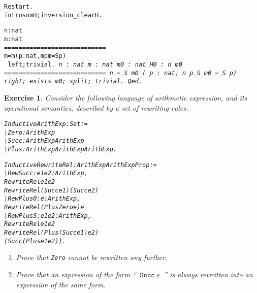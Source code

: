 \documentclass[11pt]{article}
\newtheorem{exercise}{Exercise}[section]
\begin{document}
\begin{alltt}
Restart.
 intros n m H; inversion_clear H.
\it
\it

  n : nat
  m : nat
  ============================
   m = m {\coqor} ({\exsym} p : nat, m {\coqle} p {\coqand} m = S p)
\tt
 left;trivial.
\it
  n : nat
  m : nat
  m0 : nat
  H0 : n {\coqle} m0
  ============================
   n = S m0 {\coqor} ({\exsym} p : nat, n {\coqle} p {\coqand} S m0 = S p)
\tt
 right; exists m0; split; trivial.
Qed.
\end{alltt}





\begin{exercise}
Consider the following language of arithmetic expression, and
its operational semantics, described by a set of rewriting rules.

\begin{alltt}
Inductive ArithExp : Set :=
   | Zero : ArithExp
   | Succ : ArithExp {\arrow} ArithExp
   | Plus : ArithExp {\arrow} ArithExp {\arrow} ArithExp.

Inductive RewriteRel : ArithExp {\arrow} ArithExp {\arrow} Prop :=
  |  RewSucc  : {\prodsym} e1 e2 :ArithExp,
                  RewriteRel e1 e2 {\arrow}
                   RewriteRel (Succ e1) (Succ e2)
  |  RewPlus0 : {\prodsym} e:ArithExp,
                  RewriteRel (Plus Zero e) e
  |  RewPlusS : {\prodsym} e1 e2:ArithExp,
                  RewriteRel e1 e2 {\arrow}
                  RewriteRel (Plus (Succ e1) e2)
                             (Succ (Plus e1 e2)).

\end{alltt}
\begin{enumerate}
\item Prove that \texttt{Zero} cannot be rewritten any further.
\item Prove that an expression of the form ``~$\texttt{Succ}\;e$~'' is always
rewritten
into an expression of the same form.
\end{enumerate}
\end{exercise}
\end{document}
